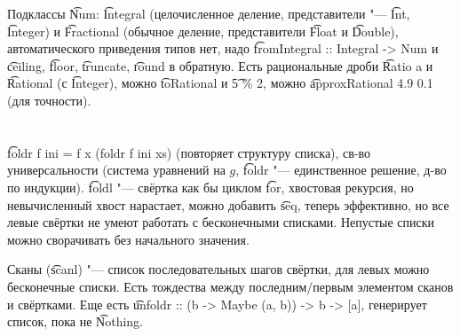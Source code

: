 Подклассы \t{Num}: \t{Integral} (целочисленное деление, представители "--- \t{Int}, \t{Integer}) и \t{Fractional}
(обычное деление, представители \t{Float} и \t{Double}), автоматического приведения типов нет,
надо \t{fromIntegral :: Integral -> Num} и \t{ceiling}, \t{floor}, \t{truncate}, \t{round} в обратную.
Есть рациональные дроби \t{Ratio a} и \t{Rational} (с \t{Integer}), можно \t{toRational} и \t{5 \% 2},
можно \t{approxRational 4.9 0.1} (для точности).

\section{} %
\t{foldr f ini = f x (foldr f ini xs)} (повторяет структуру списка), св-во универсальности (система уравнений на $g$, 
\t{foldr} "--- единственное решение, д-во по индукции).
\t{foldl} "--- свёртка как бы циклом \t{for}, хвостовая рекурсия, но невычисленный хвост нарастает, можно добавить \t{seq},
теперь эффективно, но все левые свёртки не умеют работать с бесконечными списками.
Непустые списки можно сворачивать без начального значения.

Сканы (\t{scanl}) "--- список последовательных шагов свёртки, для левых можно бесконечные списки.
Есть тождества между последним/первым элементом сканов и свёртками.
Еще есть \t{unfoldr :: (b -> Maybe (a, b)) -> b -> [a]}, генерирует список, пока не \t{Nothing}.
